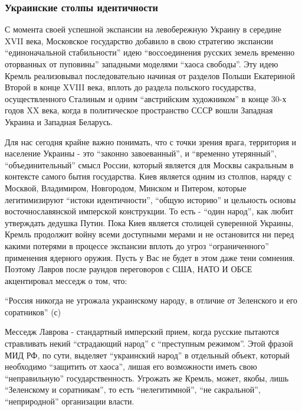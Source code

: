  
 
 
 
 

\subsubsection{Украинские столпы идентичности}

С момента своей успешной экспансии на левобережную Украину в середине XVII
века, Московское государство добавило в свою стратегию экспансии
\enquote{единоначальной стабильности} идею \enquote{воссоединения русских земель временно
оторванных от пуповины} западными моделями \enquote{хаоса свободы}. Эту идею Кремль
реализовывал последовательно начиная от разделов Польши Екатериной Второй в
конце XVIII века, вплоть до раздела польского государства, осуществленного
Сталиным и одним \enquote{австрийским художником} в конце 30-х годов XX века, когда в
политическое пространство СССР вошли Западная Украина и Западная Беларусь.

Для нас сегодня крайне важно понимать, что с точки зрения врага, территория и
население Украины - это \enquote{законно завоеванный}, и \enquote{временно утерянный},
\enquote{объединительный} смысл России, который является для Москвы сакральным в
контексте самого бытия государства. Киев является одним из столпов, наряду с
Москвой, Владимиром, Новгородом, Минском и Питером, которые легитимизируют
\enquote{истоки идентичности}, \enquote{общую историю} и цельность основы восточнославянской
имперской конструкции. То есть - \enquote{один народ}, как любит утверждать дедушка
Путин. Пока Киев является столицей суверенной Украины, Кремль продолжит войну
всеми доступными мерами и не остановится ни перед какими потерями в процессе
экспансии вплоть до угроз \enquote{ограниченного} применения ядерного оружия. Пусть у
Вас не будет в этом даже тени сомнения. Поэтому Лавров после раундов
переговоров с США, НАТО И ОБСЕ акцентировал месседж о том, что:

\enquote{Россия никогда не угрожала украинскому народу, в отличие от Зеленского и его
соратников} (с)

Месседж Лаврова - стандартный имперский прием, когда русские пытаются
стравливать некий \enquote{страдающий народ} с \enquote{преступным режимом}.
Этой фразой МИД РФ, по сути, выделяет \enquote{украинский народ} в отдельный
объект, который необходимо \enquote{защитить от хаоса}, лишая его возможности
иметь свою \enquote{неправильную} государственность. Угрожать же Кремль, может,
якобы, лишь \enquote{Зеленскому и соратникам}, то есть \enquote{нелегитимной},
\enquote{не сакральной}, \enquote{неприродной} организации власти.

